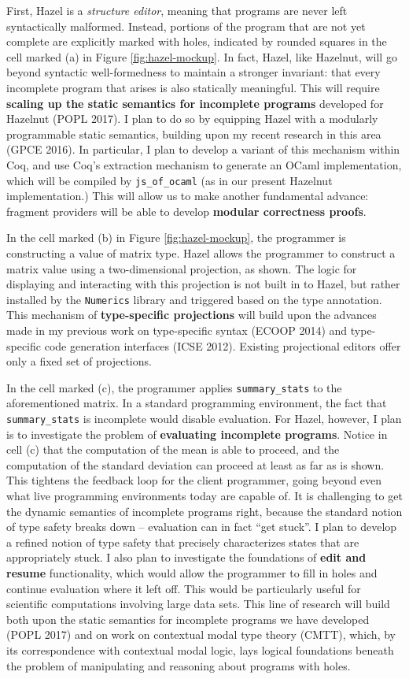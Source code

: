 \documentclass[10pt]{article}
\let\li\lstinline
\begin{document}
First, Hazel is a \emph{structure editor}, meaning that programs are never left syntactically malformed. Instead, portions of the program that are not yet complete are explicitly marked with holes, indicated by rounded squares in the cell marked (a) in Figure \ref{fig:hazel-mockup}. In fact, Hazel, like Hazelnut, will go beyond syntactic well-formedness to maintain a stronger invariant: that every incomplete program that arises is also statically meaningful. This will require \textbf{scaling up the static semantics for incomplete programs} developed for Hazelnut (POPL 2017). I plan to do so by equipping Hazel with a modularly programmable static semantics, building upon my recent research in this area (GPCE 2016). In particular, I plan to develop a variant of this mechanism within Coq, and use Coq's extraction mechanism to generate an OCaml implementation, which will be compiled by \li{js_of_ocaml} (as in our present Hazelnut implementation.) This will allow us to make another fundamental advance: fragment providers will be able to develop \textbf{modular correctness proofs}.

In the cell marked (b) in Figure \ref{fig:hazel-mockup}, the programmer is constructing a value of matrix type. Hazel allows the programmer to construct a matrix value using a {two-dimensional projection}, as shown. The logic for displaying and interacting with this projection is not built in to Hazel, but rather installed by the \li{Numerics} library and triggered based on the type annotation. This mechanism of \textbf{type-specific projections} will build upon the advances made in my previous work on type-specific syntax (ECOOP 2014) and type-specific code generation interfaces (ICSE 2012). Existing projectional editors offer only a fixed set of projections.

In the cell marked (c), the programmer applies \li{summary_stats} to the aforementioned matrix. In a standard programming environment, the fact that \li{summary_stats} is incomplete would disable evaluation. For Hazel, however, I plan is to investigate the problem of \textbf{evaluating incomplete programs}. Notice in cell (c) that the computation of the mean is able to proceed, and the computation of the standard deviation can proceed at least as far as is shown. This tightens the feedback loop for the client programmer, going beyond even what live programming environments today are capable of. It is challenging to get the dynamic semantics of incomplete programs right, because the standard notion of type safety breaks down -- evaluation can in fact ``get stuck''. I plan to develop a refined notion of type safety that precisely characterizes states that are appropriately stuck. I also plan to investigate the foundations of \textbf{edit and resume} functionality, which would allow the programmer to fill in holes and continue evaluation where it left off. This would be particularly useful for scientific computations involving large data sets. This line of research will build both upon the static semantics for incomplete programs we have developed (POPL 2017) and on work on contextual modal type theory (CMTT), which, by its correspondence with contextual modal logic, lays logical foundations beneath the problem of manipulating and reasoning about programs with holes.
\end{document}

